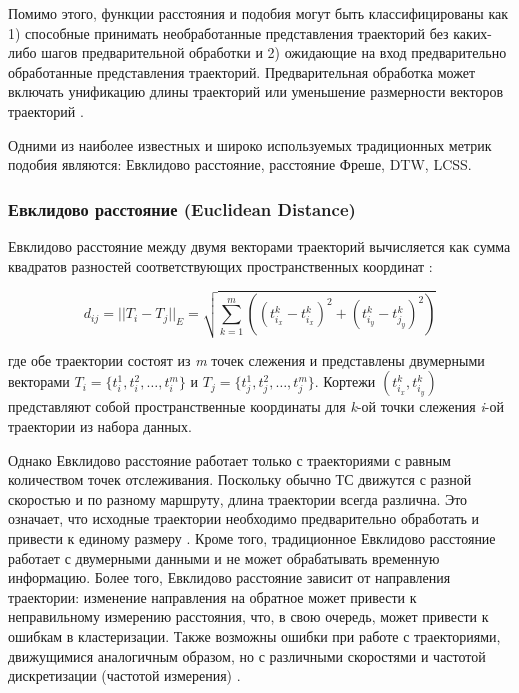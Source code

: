 Помимо этого, функции расстояния и подобия могут быть классифицированы как 1) способные принимать необработанные представления траекторий без каких-либо шагов предварительной обработки и 2) ожидающие на вход предварительно обработанные представления траекторий. Предварительная обработка может включать унификацию длины траекторий или уменьшение размерности векторов траекторий \cite{inproceedings:7_related_work}.

Одними из наиболее известных и широко используемых традиционных метрик подобия являются: Евклидово расстояние, расстояние Фреше, DTW, LCSS.

\subsubsection{Евклидово расстояние (Euclidean Distance)}

Евклидово расстояние между двумя векторами траекторий вычисляется как сумма квадратов разностей соответствующих пространственных координат \cite{article:27_vna_cad_td}:

\begin{equation}
	 d_{ij} = ||T_i - T_j||_E = \sqrt{\sum_{k=1}^{m}((t_{i_x}^k - t_{i_x}^k)^2 + (t_{i_y}^k - t_{j_y}^k)^2)}
\end{equation}

где обе траектории состоят из \textit{m} точек слежения и представлены двумерными векторами $T_i = \{t_i^1, t_i^2, \ldots, t_i^m\}$ и $T_j = \{t_j^1, t_j^2, \ldots, t_j^m\}$. Кортежи $(t_{i_x}^k, t_{i_y}^k)$ представляют собой пространственные координаты для \textit{k}-ой точки слежения \textit{i}-ой траектории из набора данных.

Однако Евклидово расстояние работает только с траекториями с равным количеством точек отслеживания. Поскольку обычно ТС движутся с разной скоростью и по разному маршруту, длина траектории всегда различна. Это означает, что исходные траектории необходимо предварительно обработать и привести к единому размеру \cite{inproceedings:7_related_work}. Кроме того, традиционное Евклидово расстояние работает с двумерными данными и не может обрабатывать временную информацию. Более того, Евклидово расстояние зависит от направления траектории: изменение направления на обратное может привести к неправильному измерению расстояния, что, в свою очередь, может привести к ошибкам в кластеризации. Также возможны ошибки при работе с траекториями, движущимися аналогичным образом, но с различными скоростями и частотой дискретизации (частотой измерения) \cite{inproceedings:28_lcss_dsmt}.

